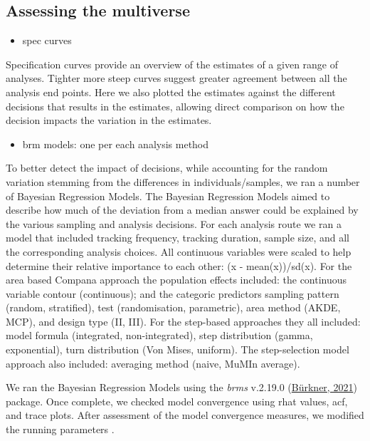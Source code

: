 \documentclass[10pt,a4paper]{article}
\providecommand{\tightlist}{%
  \setlength{\itemsep}{0pt}\setlength{\parskip}{0pt}}
\begin{document}
\hypertarget{assessing-the-multiverse}{%
\subsection{Assessing the multiverse}\label{assessing-the-multiverse}}

\begin{itemize}
\tightlist
\item
  spec curves
\end{itemize}

Specification curves provide an overview of the estimates of a given range of analyses.
Tighter more steep curves suggest greater agreement between all the analysis end points.
Here we also plotted the estimates against the different decisions that results in the estimates, allowing direct comparison on how the decision impacts the variation in the estimates.

\begin{itemize}
\tightlist
\item
  brm models: one per each analysis method
\end{itemize}

To better detect the impact of decisions, while accounting for the random variation stemming from the differences in individuals/samples, we ran a number of Bayesian Regression Models.
The Bayesian Regression Models aimed to describe how much of the deviation from a median answer could be explained by the various sampling and analysis decisions.
For each analysis route we ran a model that included tracking frequency, tracking duration, sample size, and all the corresponding analysis choices.
All continuous variables were scaled to help determine their relative importance to each other: (x - mean(x))/sd(x).
For the area based Compana approach the population effects included: the continuous variable contour (continuous); and the categoric predictors sampling pattern (random, stratified), test (randomisation, parametric), area method (AKDE, MCP), and design type (II, III).
For the step-based approaches they all included: model formula (integrated, non-integrated), step distribution (gamma, exponential), turn distribution (Von Mises, uniform).
The step-selection model approach also included: averaging method (naive, MuMIn average).

We ran the Bayesian Regression Models using the \emph{brms} v.2.19.0 (\protect\hyperlink{ref-brms}{Bürkner, 2021}) package.
Once complete, we checked model convergence using rhat values, acf, and trace plots.
After assessment of the model convergence measures, we modified the running parameters .
\end{document}

